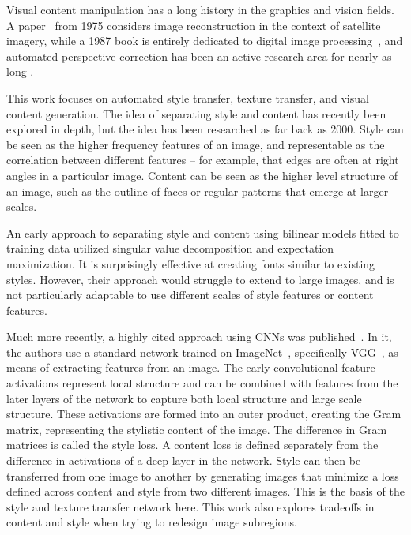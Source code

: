 \documentclass[10pt,twocolumn,letterpaper]{article}
\begin{document}
Visual content manipulation has a long history in the graphics and vision fields. A paper~\cite{simon1975digital} from 1975 considers image reconstruction in the context of satellite imagery, while a 1987 book is entirely dedicated to digital image processing~\cite{jensen1987introductory}, and automated perspective correction has been an active research area for nearly as long \cite{waltz1988implementation}.

This work focuses on automated style transfer, texture transfer, and visual content generation. The idea of separating style and content has recently been explored in depth, but the idea has been researched as far back as 2000. Style can be seen as the higher frequency features of an image, and representable as the correlation between different features -- for example, that edges are often at right angles in a particular image. Content can be seen as the higher level structure of an image, such as the outline of faces or regular patterns that emerge at larger scales.

An early approach to separating style and content using bilinear models fitted to training data utilized singular value decomposition and expectation maximization. It is surprisingly effective at creating fonts similar to existing styles\cite{tenenbaum1997separating}. However, their approach would struggle to extend to large images, and is not particularly adaptable to use different scales of style features or content features.

Much more recently, a highly cited approach using CNNs was published~\cite{gatys2016image}. In it, the authors use a standard network trained on ImageNet~\cite{ILSVRC15}, specifically VGG~\cite{simonyan2014very}, as means of extracting features from an image. The early convolutional feature activations represent local structure and can be combined with features from the later layers of the network to capture both local structure and large scale structure. These activations are formed into an outer product, creating the Gram matrix, representing the stylistic content of the image. The difference in Gram matrices is called the style loss. A content loss is defined separately from the difference in activations of a deep layer in the network. Style can then be transferred from one image to another by generating images that minimize a loss defined across content and style from two different images. This is the basis of the style and texture transfer network here. This work also explores tradeoffs in content and style when trying to redesign image subregions.
\end{document}
